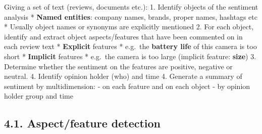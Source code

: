 \documentclass[11pt]{article}
\begin{document}
Giving a set of text (reviews, documents etc.): 1. Identify objects of
the sentiment analysis * \textbf{Named entities}: company names, brands,
proper names, hashtags etc * Usually object names or synonyms are
explicitly mentioned 2. For each object, identify and extract object
aspects/features that have been commented on in each review text *
\textbf{Explicit} features * e.g.~the \textbf{battery life} of this
camera is too short * \textbf{Implicit} features * e.g.~the camera is
too large (implicit feature: \textbf{size}) 3. Determine whether the
sentiment on the features are positive, negative or neutral. 4. Identify
opinion holder (who) and time 4. Generate a summary of sentiment by
multidimension: - on each feature and on each object - by opinion holder
group and time

    \hypertarget{aspectfeature-detection}{%
\subsection{4.1. Aspect/feature
detection}\label{aspectfeature-detection}}
\end{document}
